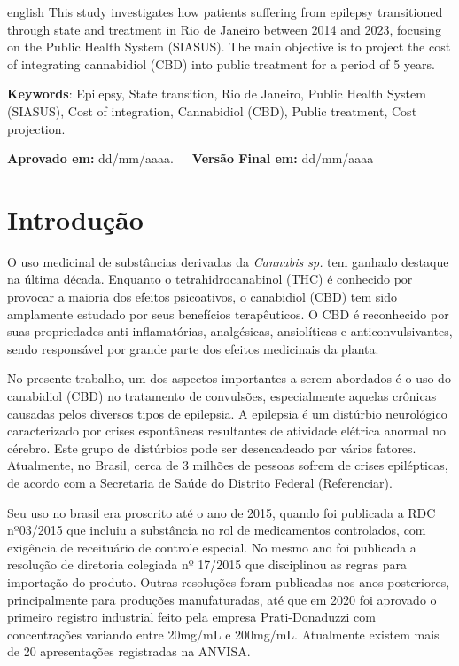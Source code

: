 \documentclass[article,a4paper,12pt,brazil,sumario=tradicional]{abntex2}
\begin{document}
\vspace{-.3cm}
\begin{hyphenrules}{english}
\noindent This study investigates how patients suffering from epilepsy transitioned through state and treatment in Rio de Janeiro between 2014 and 2023, focusing on the Public Health System (SIASUS). The main objective is to project the cost of integrating cannabidiol (CBD) into public treatment for a period of 5 years.
\end{hyphenrules}
\vspace{.4cm}
 
\noindent \textbf{Keywords}: Epilepsy, State transition, Rio de Janeiro, Public Health System (SIASUS), Cost of integration, Cannabidiol (CBD), Public treatment, Cost projection.

\vspace{.4cm}

\noindent \textbf{Aprovado em:} dd/mm/aaaa.~~~\textbf{Versão Final em:} dd/mm/aaaa

\section{Introdução}

O uso medicinal de substâncias derivadas da \textit{Cannabis sp.} tem ganhado destaque na última década. Enquanto o tetrahidrocanabinol (THC) é conhecido por provocar a maioria dos efeitos psicoativos, o canabidiol (CBD) tem sido amplamente estudado por seus benefícios terapêuticos. O CBD é reconhecido por suas propriedades anti-inflamatórias, analgésicas, ansiolíticas e anticonvulsivantes, sendo responsável por grande parte dos efeitos medicinais da planta.

No presente trabalho, um dos aspectos importantes a serem abordados é o uso do canabidiol (CBD) no tratamento de convulsões, especialmente aquelas crônicas causadas pelos diversos tipos de epilepsia. A epilepsia é um distúrbio neurológico caracterizado por crises espontâneas resultantes de atividade elétrica anormal no cérebro. Este grupo de distúrbios pode ser desencadeado por vários fatores. Atualmente, no Brasil, cerca de 3 milhões de pessoas sofrem de crises epilépticas, de acordo com a Secretaria de Saúde do Distrito Federal (Referenciar).

Seu uso no brasil era proscrito até o ano de 2015, quando foi publicada a RDC nº03/2015 que incluiu a substância no rol de medicamentos controlados, com exigência de receituário de controle especial. No mesmo ano foi publicada a resolução de diretoria colegiada nº 17/2015 que disciplinou as regras para importação do produto. Outras resoluções foram publicadas nos anos posteriores, principalmente para produções manufaturadas, até que em 2020 foi aprovado o primeiro registro industrial feito pela empresa Prati-Donaduzzi com concentrações variando entre 20mg/mL e 200mg/mL. Atualmente existem mais de 20 apresentações registradas na ANVISA.
\end{document}

